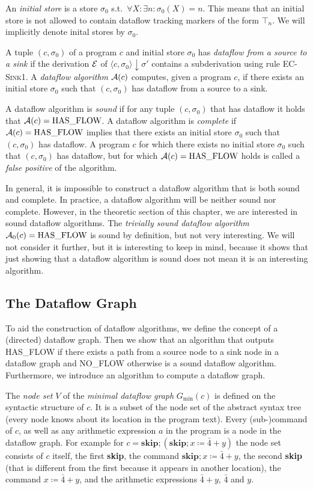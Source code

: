 An \emph{initial store} is a store $\sigma_0$ s.t.\ 
$\forall X: \exists n: \sigma_0(X) = n$.
This means that an initial store is not allowed to contain dataflow tracking 
markers of the form $\top_n$.
We will implicitly denote inital stores by $\sigma_0$.

A tuple $(c, \sigma_0)$ of a program $c$ and initial store $\sigma_0$ 
has \emph{dataflow from a source to a sink} if the derivation $\operatorname{\mathcal{E}}$
of $\langle c, \sigma_0 \rangle \downarrow \sigma'$ contains a 
subderivation using rule \textsc{EC-Sink1}.
A \emph{dataflow algorithm} $\operatorname{\mathcal{A}}(c)$ computes, given a program $c$,
if there exists an initial store $\sigma_0$ 
such that $(c, \sigma_0)$ has dataflow from a source to a sink.

A dataflow algorithm is \emph{sound} if for any tuple $(c, \sigma_0)$ that
has dataflow it holds that $\operatorname{\mathcal{A}}(c) = \text{HAS\_FLOW}$.
A dataflow algorithm is \emph{complete} if $\operatorname{\mathcal{A}}(c) = \text{HAS\_FLOW}$
implies that there exists an initial store $\sigma_0$
 such that $(c, \sigma_0)$ has dataflow.
A program $c$ for which there exists no initial store $\sigma_0$ such that 
$(c, \sigma_0)$ has dataflow, but for which $\operatorname{\mathcal{A}}(c) = \text{HAS\_FLOW}$ holds
is called a \emph{false positive} of the algorithm.

In general, it is impossible to construct a dataflow algorithm that is both 
sound and complete.
In practice, a dataflow algorithm will be neither sound nor complete.
However, in the theoretic section of this chapter, we are interested in 
sound dataflow algorithms.
The \emph{trivially sound dataflow algorithm} $\operatorname{\mathcal{A}}_0(c) = \text{HAS\_FLOW}$ 
is sound by definition, but not very interesting.
We will not consider it further, but it is interesting to keep in mind,
because it shows that just showing that a dataflow algorithm is sound does not
mean it is an interesting algorithm.

\subsection{The Dataflow Graph}
To aid the construction of dataflow algorithms, we define the concept
of a (directed) dataflow graph.
Then we show that an algorithm that outputs HAS\_FLOW if 
there exists a path from a source 
node to a sink node in a dataflow graph and NO\_FLOW otherwise
is a sound dataflow algorithm.
Furthermore, we introduce an algorithm to compute a dataflow graph.

The \emph{node set} $V$ of the \emph{minimal dataflow graph} $G_\text{min}(c)$
is defined on the syntactic structure
of $c$. It is a subset of the node set of the abstract syntax tree
(every node knows about its location in the program text).
Every (sub-)command of $c$, as well as any arithmetic expression $a$ in the 
program is a node in the dataflow graph.
For example for
$c = \textbf{skip}; (\textbf{skip}; x \coloneqq \bar{4} + y)$
the node set consists of $c$ itself, the first \textbf{skip}, the command 
$\textbf{skip}; x \coloneqq \bar{4} + y$, the second \textbf{skip} (that is different 
from the first because it appears in another location), the command
$x \coloneqq \bar{4} + y$, and the arithmetic expressions $\bar{4}+y$,
$\bar{4}$ and $y$.


